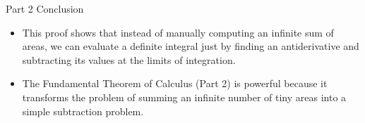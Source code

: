 \documentclass{beamer}
\begin{document}

\begin{frame}{Part 2 Conclusion}
    \begin{itemize}
        \item This proof shows that instead of manually computing an infinite sum of areas, we can evaluate a definite integral just by finding an antiderivative and subtracting its values at the limits of integration.
        \item The Fundamental Theorem of Calculus (Part 2) is powerful because it transforms the problem of summing an infinite number of tiny areas into a simple subtraction problem.
    \end{itemize}
\end{frame}
\newpage


\end{document}
